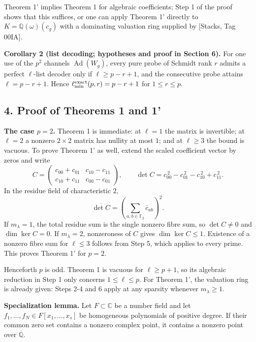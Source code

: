 \documentclass[
  11pt,
  a4paper,
]{article}
\begin{document}
Theorem 1' implies Theorem 1 for algebraic coefficients; Step 1 of the
proof shows that this suffices, or one can apply Theorem 1' directly to
\(K=\mathbb Q(\omega)(c_g)\) with a dominating valuation ring supplied
by {[}Stacks, Tag 00IA{]}.

\textbf{Corollary 2 (list decoding; hypotheses and proof in Section 6).}
For one use of the \(p^2\) channels \(\operatorname{Ad}(W_g)\), every
pure probe of Schmidt rank \(r\) admits a perfect \(\ell\)-list decoder
only if \(\ell\ge p-r+1\), and the consecutive probe attains
\(\ell=p-r+1\). Hence \(\ell^{\rm exact}_{\min}(p,\allowbreak{}r)=p-r+1\) for
\(1\le r\le p\).

\subsection{4. Proof of Theorems 1 and
1'}\label{proof-of-theorems-1-and-1}

\textbf{The case \(p=2\).} Theorem 1 is immediate: at \(\ell=1\) the
matrix is invertible; at \(\ell=2\) a nonzero \(2\times2\) matrix has
nullity at most \(1\); and at \(\ell\ge3\) the bound is vacuous. To
prove Theorem 1' as well, extend the scaled coefficient vector by zeros
and write
\[C=\begin{pmatrix}c_{00}+c_{01}&c_{10}-c_{11}\\c_{10}+c_{11}&c_{00}-c_{01}\end{pmatrix},\qquad \det C=c_{00}^{\,2}-c_{01}^{\,2}-c_{10}^{\,2}+c_{11}^{\,2}.\]
In the residue field of characteristic \(2\),
\[\overline{\det C}=\left(\sum_{a,b\in\mathbb F_2}\bar c_{ab}\right)^2.\]
If \(m_\lambda=1\), the total residue sum is the single nonzero fibre
sum, so \(\det C\ne0\) and \(\dim\ker C=0\). If \(m_\lambda=2\),
nonzeroness of \(C\) gives \(\dim\ker C\le1\). Existence of a nonzero
fibre sum for \(\ell\le3\) follows from Step 5, which applies to every
prime. This proves Theorem 1' for \(p=2\).

Henceforth \(p\) is odd. Theorem 1 is vacuous for \(\ell\ge p+1\), so
its algebraic reduction in Step 1 only concerns \(1\le\ell\le p\). For
Theorem 1', the valuation ring is already given: Steps 2-4 and 6 apply
at any sparsity whenever \(m_\lambda\ge1\).

\textbf{Specialization lemma.} Let \(F\subset\mathbb C\) be a number
field and let \(f_1,\allowbreak{}\ldots,\allowbreak{}f_N\in F[x_1,\allowbreak{}\ldots,\allowbreak{}x_s]\) be homogeneous
polynomials of positive degree. If their common zero set contains a
nonzero complex point, it contains a nonzero point over
\(\overline{\mathbb Q}\).
\end{document}
